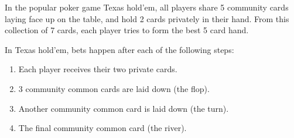 \documentclass[12pt]{exam}
\begin{document}
\begin{questions}
In the popular poker game Texas hold'em, all players share 5 community cards laying face up on the table, and hold 2 cards privately in their hand.
From this collection of 7 cards, each player tries to form the best 5 card hand.

\question
In Texas hold'em, bets happen after each of the following steps:
\begin{enumerate}
\item Each player receives their two private cards.
\item 3 community common cards are laid down (the flop).
\item Another community common card is laid down (the turn).
\item The final community common card (the river).
\end{enumerate}

\end{questions}
\end{document}
